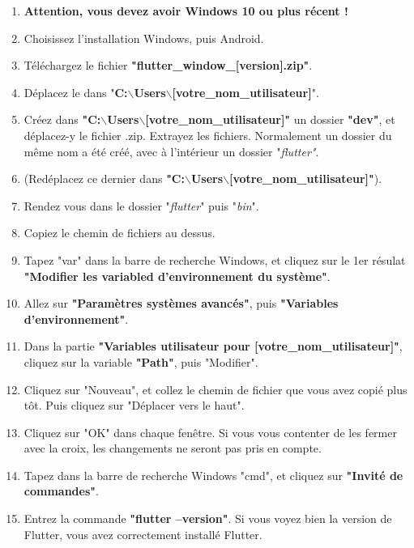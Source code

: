 \begin{enumerate}

  \item \textbf{Attention, vous devez avoir Windows 10 ou plus récent !}

  \item Choisissez l'installation Windows, puis Android.

  \item Téléchargez le fichier \textbf{"flutter\_window\_[version].zip"}.

  \item Déplacez le dans "\textbf{C:$\backslash$Users$\backslash$[votre\_nom\_utilisateur]}".

  \item Créez dans \textbf{"C:$\backslash$Users$\backslash$[votre\_nom\_utilisateur]"} un dossier \textbf{"dev"}, et déplacez-y le fichier .zip. Extrayez les fichiers. Normalement un dossier du même nom a été créé, avec à l'intérieur un dossier "\textit{flutter"}.

  \item (Redéplacez ce dernier dans \textbf{"C:$\backslash$Users$\backslash$[votre\_nom\_utilisateur]"}).

  \item Rendez vous dans le dossier "\textit{flutter}" puis "\textit{bin}".

  \item Copiez le chemin de fichiers au dessus.

  \item Tapez "var" dans la barre de recherche Windows, et cliquez sur le 1er résulat \textbf{"Modifier les variabled d'environnement du système"}.

  \item Allez sur \textbf{"Paramètres systèmes avancés"}, puis \textbf{"Variables d'environnement"}.

  \item Dans la partie \textbf{"Variables utilisateur pour [votre\_nom\_utilisateur]"}, cliquez sur la variable \textbf{"Path"}, puis "Modifier".

  \item Cliquez sur "Nouveau", et collez le chemin de fichier que vous avez copié plus tôt. Puis cliquez sur "Déplacer vers le haut".

  \item Cliquez sur "OK" dans chaque fenêtre. Si vous vous contenter de les fermer avec la croix, les changements ne seront pas pris en compte.

  \item Tapez dans la barre de recherche Windows "cmd", et cliquez sur \textbf{"Invité de commandes"}.

  \item Entrez la commande \textbf{"flutter --version"}. Si vous voyez bien la version de Flutter, vous avez correctement installé Flutter.

\end{enumerate}

